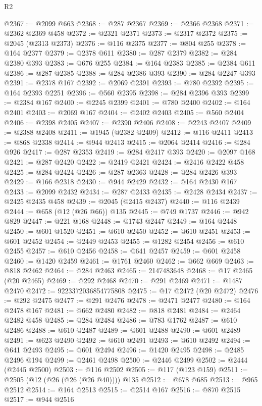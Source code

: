 \begin{lexlean}{R2}
\begin{coremodule}
@2367 := @2099 @663
@2368 := @287 @2367
@2369 := @2366 @2368
@2371 := @2362 @2369 @458
@2372 := @2321 @2371
@2373 := @2317 @2372
@2375 := @2045 (@2313 @2373)
@2376 := @116 @2375
@2377 := @804 @255
@2378 := @164 @2377
@2379 := @2378 @611
@2380 := @287 @2379
@2382 := @284 @2380 @393
@2383 := @676 @255
@2384 := @164 @2383
@2385 := @2384 @611
@2386 := @287 @2385
@2388 := @284 @2386 @393
@2390 := @284 @2247 @393
@2391 := @2378 @167
@2392 := @2069 @2391
@2393 := @780 @2392
@2395 := @164 @2393 @2251
@2396 := @560 @2395
@2398 := @284 @2396 @393
@2399 := @2384 @167
@2400 := @2245 @2399
@2401 := @780 @2400
@2402 := @164 @2401
@2403 := @2069 @167
@2404 := @2402 @2403
@2405 := @560 @2404
@2406 := @2398 @2405
@2407 := @2390 @2406
@2408 := @2243 @2407
@2409 := @2388 @2408
@2411 := @1945 (@2382 @2409)
@2412 := @116 @2411
@2413 := @868 @2338
@2414 := @944 @2413
@2415 := @2064 @2414
@2416 := @284 @926
@2417 := @287 @2353
@2419 := @284 @2417 @393
@2420 := @2097 @168
@2421 := @287 @2420
@2422 := @2419 @2421
@2424 := @2416 @2422 @458
@2425 := @284 @2424
@2426 := @287 @2363
@2428 := @284 @2426 @393
@2429 := @166 @2318
@2430 := @944 @2429
@2432 := @164 @2430 @167
@2433 := @2099 @2432
@2434 := @287 @2433
@2435 := @2428 @2434
@2437 := @2425 @2435 @458
@2439 := @2045 (@2415 @2437)
@2440 := @116 @2439
@2444 := @658 (@12 (@26 @66)) @135
@2445 := @749 @1737
@2446 := @942 @829
@2447 := @221 @168
@2448 := @1743 @2447
@2449 := @164 @2448
@2450 := @601 @1520
@2451 := @610 @2450
@2452 := @610 @2451
@2453 := @601 @2452
@2454 := @2449 @2453
@2455 := @1282 @2454
@2456 := @610 @2455
@2457 := @610 @2456
@2458 := @641 @2457
@2459 := @601 @2458
@2460 := @1420 @2459
@2461 := @1761 @2460
@2462 := @662 @669
@2463 := @818 @2462
@2464 := @284 @2463
@2465 := 2147483648
@2468 := @17 @2465 (@20 @2465)
@2469 := @292 @2468
@2470 := @291 @2469
@2471 := @1487 @2470
@2472 := 9223372036854775808
@2475 := @17 @2472 (@20 @2472)
@2476 := @292 @2475
@2477 := @291 @2476
@2478 := @2471 @2477
@2480 := @164 @2478 @167
@2481 := @662 @2480
@2482 := @818 @2481
@2484 := @2464 @2482 @458
@2485 := @284 @2484
@2486 := @783 @1762
@2487 := @610 @2486
@2488 := @610 @2487
@2489 := @601 @2488
@2490 := @601 @2489
@2491 := @623 @2490
@2492 := @610 @2491
@2493 := @610 @2492
@2494 := @641 @2493
@2495 := @601 @2494
@2496 := @1420 @2495
@2498 := @2485 @2496 @194
@2499 := @2461 @2498
@2500 := @2446 @2499
@2502 := @2444 (@2445 @2500)
@2503 := @116 @2502
@2505 := @117 (@123 @159)
@2511 := @2505 (@12 (@26 (@26 (@26 @40)))) @135
@2512 := @678 @685
@2513 := @965 @2512
@2514 := @164 @2513
@2515 := @2514 @167
@2516 := @870 @2515
@2517 := @944 @2516

\end{coremodule}
\end{lexlean}
